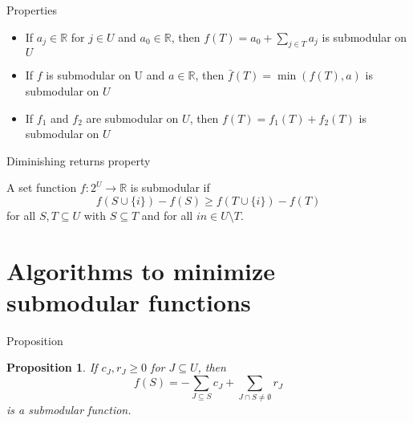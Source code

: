 \documentclass[usenames,dvipsnames]{beamer}
\newcommand{\R}{\mathbb{R}}
\newtheorem{prop}{Proposition}
\begin{document}
\begin{frame}{Properties}
  \begin{itemize}
  \item If $a_j \in \R$ for $j \in U$ and $a_0 \in \R$, then $f(T) =
    a_0 + \sum\limits_{j \in T} a_j$ is submodular on $U$
  \item If $f$ is submodular on U and $a \in \R$, then $\bar{f}(T) =
    \min(f(T),a)$ is submodular on $U$
  \item If $f_1$ and $f_2$ are submodular on $U$, then $f(T) = f_1(T)
    + f_2(T)$ is submodular on $U$
  \end{itemize}
\end{frame}

\begin{frame}{Diminishing returns property}
  \begin{definition}
    A set function $f : 2^U \rightarrow \R$ is submodular if \[f(S
    \cup \{i\}) - f(S) \geq f(T \cup \{i\}) - f(T) \] for all $S,T
    \subseteq U$ with $S \subseteq T$ and for all $in \in U \setminus
    T$.
  \end{definition}
\end{frame}

\section{Algorithms to minimize submodular functions}
\begin{frame}{Proposition}
  \begin{prop}\label{prop}
    If $c_J, r_J \geq 0$ for $J \subseteq U$,
    then \begin{equation}f(S) = -\sum\limits_{J \subseteq S} c_J +
      \sum\limits_{J \cap S \neq \emptyset}
      r_J\label{prop}\end{equation} is a submodular function.
  \end{prop}
\end{frame}
\end{document}
